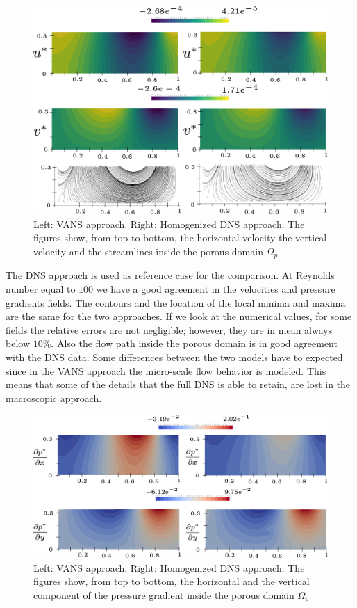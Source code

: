 \begin{figure}[H]
	\centering
	\includegraphics[width=1\linewidth]{chapter_5/figure/re100/vans_u}
	\caption{Left: VANS approach. Right: Homogenized DNS approach. The figures show, from top to bottom, the horizontal velocity the vertical velocity and the streamlines inside the porous domain $\Omega_p$}
	\label{fig:100_u}
\end{figure}

The DNS approach is used as reference case for the comparison. At Reynolds number equal to $100$ we have a good agreement in the velocities and pressure gradients fields. The contours and the location of the local minima and maxima are the same for the two approaches. If we look at the numerical values, for some fields the relative errors are not negligible; however, they are in mean always below $10\%$. Also the flow path inside the porous domain is in good agreement with the DNS data.
Some differences between the two models have to expected since in the VANS approach the micro-scale flow behavior is modeled. This means that some of the details that the full DNS is able to retain, are lost in the macroscopic approach. 

\begin{figure}[H]
	\centering
	\includegraphics[width=1\linewidth]{chapter_5/figure/re100/vans_p}
	\caption{Left: VANS approach. Right: Homogenized DNS approach. The figures show, from top to bottom, the horizontal and the vertical component of the pressure gradient inside the porous domain $\Omega_p$}
	\label{fig:100_p}
\end{figure}


